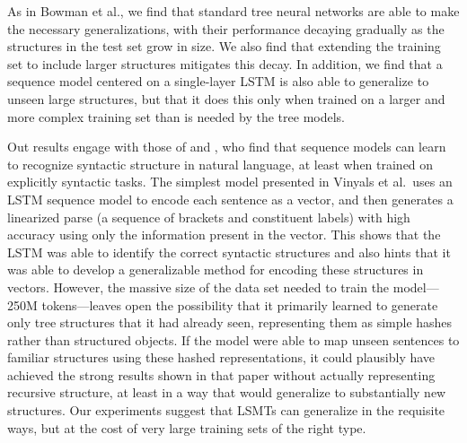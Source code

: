 As in Bowman et al., we find that standard tree neural networks are able to make the necessary generalizations, with their performance decaying gradually as the structures in the test set grow in size. We also find that extending the training set to include larger structures mitigates this decay. In addition, we find that a sequence model centered on a single-layer LSTM is also able to generalize to unseen large structures, but that it does this only when trained on a larger and more complex training set than is needed by the tree models. 

Out results engage with those of  and , who find that sequence models can learn to recognize syntactic structure in natural language, at least when trained on explicitly syntactic tasks. The simplest model presented in Vinyals et al.~uses an LSTM sequence model to encode each sentence as a vector, and then generates a linearized parse (a sequence of brackets and constituent labels) with high accuracy using only the information present in the vector. This shows that the LSTM was able to identify the correct syntactic structures and also hints that it was able to develop a generalizable method for encoding these structures in vectors. However, the massive size of the data set needed to train the model---250M tokens---leaves open the possibility that it primarily learned to generate only tree structures that it had already seen, representing them as simple hashes rather than structured objects. If the model were able to map unseen sentences to familiar structures using these hashed representations, it could plausibly have achieved the strong results shown in that paper without actually representing recursive structure, at least in a way that would generalize to substantially new structures. Our experiments suggest that LSMTs can generalize in the requisite ways, but at the cost of very large training sets of the right type.